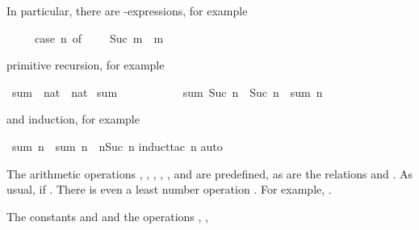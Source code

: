 %
\begin{isabellebody}%
\def\isabellecontext{natsum}%
\isamarkupfalse%
%
\begin{isamarkuptext}%
\noindent
In particular, there are -expressions, for example
\begin{isabelle}%
\ \ \ \ \ case\ n\ of\ {}\ {\isasymRightarrow}\ {}\ {\isacharbar}\ Suc\ m\ {\isasymRightarrow}\ m%
\end{isabelle}
primitive recursion, for example%
\end{isamarkuptext}%
\isamarkuptrue%
\ sum\ {\isacharcolon}{\isacharcolon}\ {\isachardoublequote}nat\ {\isasymRightarrow}\ nat{\isachardoublequote}\isanewline
\isamarkupfalse%
\ {\isachardoublequote}sum\ {}\ {\isacharequal}\ {}{\isachardoublequote}\isanewline
\ \ \ \ \ \ \ \ {\isachardoublequote}sum\ {\isacharparenleft}Suc\ n{\isacharparenright}\ {\isacharequal}\ Suc\ n\ {\isacharplus}\ sum\ n{\isachardoublequote}\isamarkupfalse%
%
\begin{isamarkuptext}%
\noindent
and induction, for example%
\end{isamarkuptext}%
\isamarkuptrue%
\ {\isachardoublequote}sum\ n\ {\isacharplus}\ sum\ n\ {\isacharequal}\ n{\isacharasterisk}{\isacharparenleft}Suc\ n{\isacharparenright}{\isachardoublequote}\isanewline
\isamarkupfalse%
induct{\isacharunderscore}tac\ n{\isacharparenright}\isanewline
\isamarkupfalse%
auto{\isacharparenright}\isanewline
\isamarkupfalse%
\isamarkupfalse%
%
\begin{isamarkuptext}%
\newcommand{\mystar}{*%
}
%
The arithmetic operations ,
, \isadxboldpos{\mystar}{$HOL2arithfun},
, ,  and
 are predefined, as are the relations
 and
. As usual,  if
. There is even a least number operation
\@.  For example, .
\begin{warn}
  The constants  and  and the operations
  , ,

\end{warn}
\end{isamarkuptext}
\end{isabellebody}
